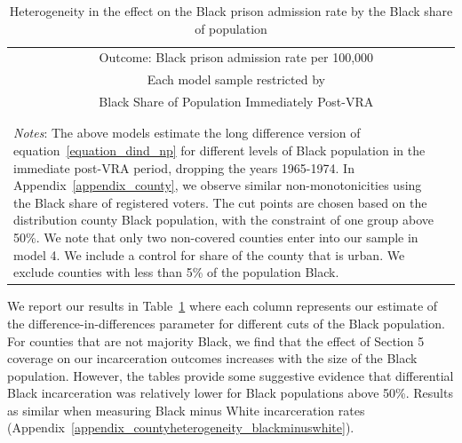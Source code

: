 \documentclass[12pt]{article}
\begin{document}
\begin{table}[t!]\centering \footnotesize
\def\sym#1{\ifmmode^{#1}\else\(^{#1}\)\fi}
	\caption{Heterogeneity in the effect on the Black prison admission rate by the Black share of population}\label{table_heterogeneous1}
	\smallskip
	\begin{tabular}{@{\extracolsep{5pt}}l*{5}{c}}
    	\noalign{\smallskip}\hline\hline\noalign{\smallskip}\noalign{\smallskip}
					&  \multicolumn{4}{c}{Outcome: Black prison admission rate per 100,000} \\
    			\cline{2-5}   \noalign{\smallskip}
					&  \multicolumn{4}{c}{Each model sample restricted by} \\
					&  \multicolumn{4}{c}{Black Share of Population Immediately Post-VRA} \\
    			 \\
	\noalign{\vspace*{-.17in}}\hline\hline\noalign{\smallskip}
    \multicolumn{5}{l}{\scriptsize \sym{*} \(p<0.1\), \sym{**} \(p<0.05\), \sym{***} \(p<0.01\)}\\
    \multicolumn{5}{p{5.1in}}{\scriptsize  \emph{Notes}: The above models estimate the long difference version of equation~\ref{equation_dind_np} for different levels of Black population in the immediate post-VRA period, dropping the years 1965-1974.  In Appendix~\ref{appendix_county}, we observe similar non-monotonicities using the Black share of registered voters. The cut points are chosen based on the distribution county Black population, with the constraint of one group above 50\%.  We note that only two non-covered counties enter into our sample in model 4.  We include a control for share of the county that is urban.  We exclude counties with less than 5\% of the population Black.}
\end{tabular}
\end{table}

We report our results in Table~\ref{table_heterogeneous1} where each column represents our estimate of the difference-in-differences parameter for different cuts of the Black population.  For counties that are not majority Black, we find that the effect of Section 5 coverage on our incarceration outcomes increases with the size of the Black population. However, the tables provide some suggestive evidence that differential Black incarceration was relatively lower for Black populations above 50\%. Results as similar when measuring Black minus White incarceration rates (Appendix~\ref{appendix_countyheterogeneity_blackminuswhite}).
\end{document}
